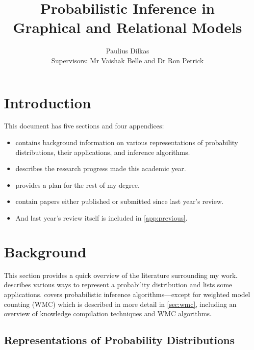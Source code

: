 \documentclass{article}
\title{Probabilistic Inference in Graphical and Relational Models}
\author{Paulius Dilkas \\[1ex] {\small Supervisors: Mr Vaishak Belle and Dr Ron
    Petrick}}
\affil{School of Informatics, University of Edinburgh}
\begin{document}
\maketitle

\section{Introduction}

This document has five sections and four appendices:
\begin{itemize}
\item {} contains background information on various
  representations of probability distributions, their applications, and
  inference algorithms.
\item {} describes the research progress made this academic
  year.
\item {} provides a plan for the rest of my degree.
\item {} contain papers either published or submitted
  since last year's review.
\item And last year's review itself is included in \cref{app:previous}.
\end{itemize}

\section{Background} \label{sec:background}

This section provides a quick overview of the literature surrounding my work.
 describes various ways to represent a probability
distribution and lists some applications.  covers
probabilistic inference algorithms---except for weighted model counting (WMC)
which is described in more detail in \cref{sec:wmc}, including an overview
of knowledge compilation techniques and WMC algorithms.

\subsection{Representations of Probability
  Distributions} \label{sec:representations}
\end{document}
